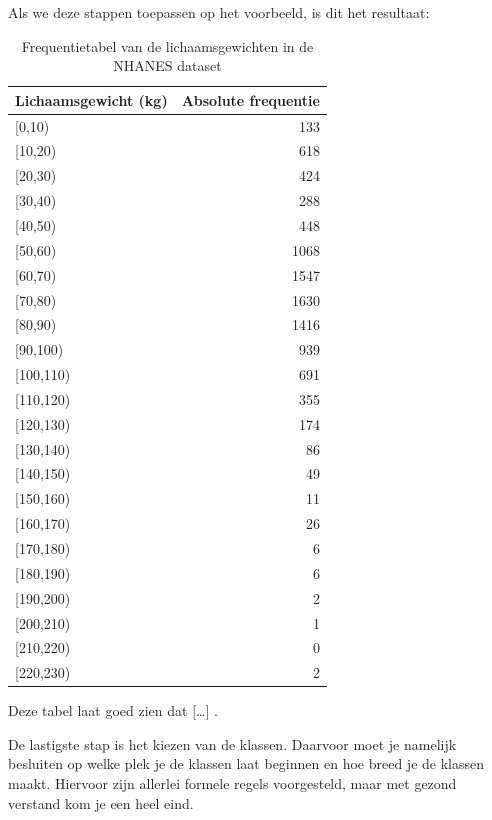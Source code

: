 \documentclass[
  a4paper,
]{scrbook}
\theoremstyle{definition}
\theoremstyle{definition}
\theoremstyle{remark}
\begin{document}
Als we deze stappen toepassen op het voorbeeld, is dit het resultaat:

\begin{longtable}[]{@{}lr@{}}

\caption{\label{tbl-gewicht}Frequentietabel van de lichaamsgewichten in
de NHANES dataset}

\tabularnewline

\toprule\noalign{}
Lichaamsgewicht (kg) & Absolute frequentie \\
\midrule\noalign{}
\endhead
\bottomrule\noalign{}
\endlastfoot
{[}0,10) & 133 \\
{[}10,20) & 618 \\
{[}20,30) & 424 \\
{[}30,40) & 288 \\
{[}40,50) & 448 \\
{[}50,60) & 1068 \\
{[}60,70) & 1547 \\
{[}70,80) & 1630 \\
{[}80,90) & 1416 \\
{[}90,100) & 939 \\
{[}100,110) & 691 \\
{[}110,120) & 355 \\
{[}120,130) & 174 \\
{[}130,140) & 86 \\
{[}140,150) & 49 \\
{[}150,160) & 11 \\
{[}160,170) & 26 \\
{[}170,180) & 6 \\
{[}180,190) & 6 \\
{[}190,200) & 2 \\
{[}200,210) & 1 \\
{[}210,220) & 0 \\
{[}220,230) & 2 \\

\end{longtable}

Deze tabel laat goed zien dat {[}\ldots{]} .

De lastigste stap is het kiezen van de klassen. Daarvoor moet je
namelijk besluiten op welke plek je de klassen laat beginnen en hoe
breed je de klassen maakt. Hiervoor zijn allerlei formele regels
voorgesteld, maar met gezond verstand kom je een heel eind.
\end{document}
